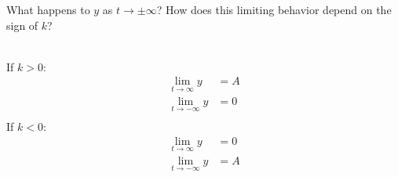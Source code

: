 What happens to $y$ as $t \to \pm\infty$? How does this limiting behavior depend on the sign of $k$?

\begin{solution}\ \\
If $k > 0$:
\begin{align*}
    \lim_{t \to \infty} y &= A \\
    \lim_{t \to -\infty} y &= 0 \\
\end{align*}
If $k < 0$:
\begin{align*}
    \lim_{t \to \infty} y &= 0 \\
    \lim_{t \to -\infty} y &= A \\
\end{align*}
\end{solution}